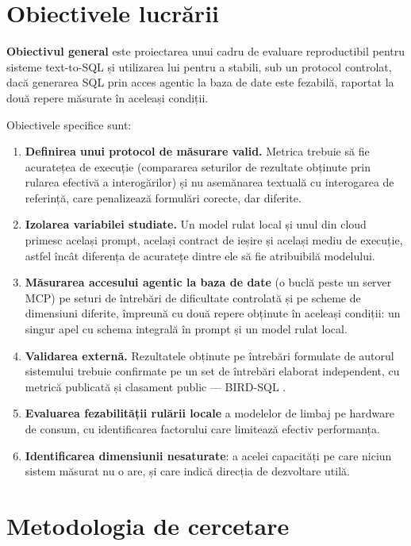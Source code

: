 \documentclass[12pt,a4paper]{report}
\begin{document}
\section{Obiectivele lucrării}

\textbf{Obiectivul general} este proiectarea unui cadru de evaluare
reproductibil pentru sisteme text-to-SQL și utilizarea lui pentru a stabili,
sub un protocol controlat, dacă generarea SQL prin acces agentic la baza de
date este fezabilă, raportat la două repere măsurate în aceleași condiții.

Obiectivele specifice sunt:

\begin{enumerate}[nosep,leftmargin=*]
  \item \textbf{Definirea unui protocol de măsurare valid.} Metrica trebuie
    să fie acuratețea de execuție (compararea seturilor de rezultate
    obținute prin rularea efectivă a interogărilor) și nu asemănarea
    textuală cu interogarea de referință, care penalizează formulări
    corecte, dar diferite.
  \item \textbf{Izolarea variabilei studiate.} Un model rulat local și unul
    din cloud primesc același prompt, același contract de ieșire și același
    mediu de execuție, astfel încât diferența de acuratețe dintre ele să fie
    atribuibilă modelului.
  \item \textbf{Măsurarea accesului agentic la baza de date} (o buclă
    peste un server MCP) pe seturi de întrebări de dificultate controlată
    și pe scheme de dimensiuni diferite, împreună cu două repere obținute în
    aceleași condiții: un singur apel cu schema integrală în prompt și un
    model rulat local.
  \item \textbf{Validarea externă.} Rezultatele obținute pe întrebări formulate
    de autorul sistemului trebuie confirmate pe un set de întrebări elaborat
    independent, cu metrică publicată și clasament public — BIRD-SQL
    \cite{bird}.
  \item \textbf{Evaluarea fezabilității rulării locale} a modelelor de
    limbaj pe hardware de consum, cu identificarea factorului care limitează
    efectiv performanța.
  \item \textbf{Identificarea dimensiunii nesaturate}: a acelei capacități
    pe care niciun sistem măsurat nu o are, și care indică direcția de
    dezvoltare utilă.
\end{enumerate}

\section{Metodologia de cercetare}
\end{document}

